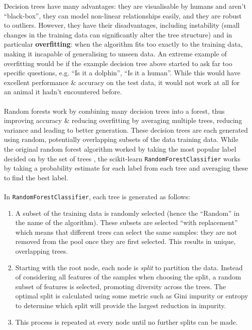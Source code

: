 \documentclass[a4paper]{article}
\begin{document}
Decision trees have many advantages: they are visualisable by humans and aren't ``black-box'', they can model non-linear relationships easily, and they are robust to outliers.
However, they have their disadvantages, including instability (small changes in the training data can significantly alter the tree structure) and in particular \textbf{overfitting}: when the algorithm fits too exactly to the training data, making it incapable of generalising to unseen data.
An extreme example of overfitting would be if the example decision tree above started to ask far too specific questions, e.g. ``Is it a dolphin'', ``Is it a human''. 
While this would have excellent performance \& accuracy on the test data, it would not work at all for an animal it hadn't encountered before.
\\\\
Random forests work by combining many decision trees into a forest, thus improving accuracy \& reducing overfitting by averaging multiple trees, reducing variance and leading to better generation.
These decision trees are each generated using random, potentially overlapping subsets of the data training data.
While the original random forest algorithm worked by taking the most popular label decided on by the set of trees \supercite{breiman}, the scikit-learn \texttt{RandomForestClassifier} works by taking a probability estimate for each label from each tree and averaging these to find the best label\supercite{scikit_ensembles}.
\\\\
In \texttt{RandomForestClassifier}, each tree is generated as follows:
\begin{enumerate}
    \item   A subset of the training data is randomly selected (hence the ``Random'' in the name of the algorithm).
            These subsets are selected ``with replacement'' which means that different trees can select the same samples: they are not removed from the pool once they are first selected.
            This results in unique, overlapping trees.
    \item   Starting with the root node, each node is \textit{split} to partition the data.
            Instead of considering all features of the samples when choosing the split, a random subset of features is selected, promoting diversity across the trees.
            The optimal split is calculated using some metric such as Gini impurity or entropy to determine which split will provide the largest reduction in impurity.
    \item   This process is repeated at every node until no further splits can be made.
\end{enumerate}
\end{document}
